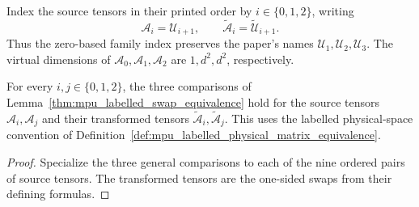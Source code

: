 \begin{definition}
    \label{def:mpu_three_labelled_source_families}
    \leanok
    Index the source tensors in their printed order by
    $i\in\{0,1,2\}$, writing
    \[
        \mathcal A_i=\mathcal U_{i+1},\qquad
        \widetilde{\mathcal A}_i=\widetilde{\mathcal U}_{i+1}.
    \]
    Thus the zero-based family index preserves the paper's names
    $\mathcal U_1,\mathcal U_2,\mathcal U_3$. The virtual dimensions of
    $\mathcal A_0,\mathcal A_1,\mathcal A_2$ are $1,d^2,d^2$, respectively.
\end{definition}

\begin{lemma}
    \label{thm:mpu_three_labelled_source_swap_comparison}
    \leanok
    For every $i,j\in\{0,1,2\}$, the three comparisons of
    Lemma~\ref{thm:mpu_labelled_swap_equivalence} hold for the source
    tensors $\mathcal A_i,\mathcal A_j$ and their transformed tensors
    $\widetilde{\mathcal A}_i,\widetilde{\mathcal A}_j$.
    This uses the labelled physical-space convention of
    Definition~\ref{def:mpu_labelled_physical_matrix_equivalence}.
\end{lemma}

\begin{proof}\leanok
    Specialize the three general comparisons to each of the nine ordered
    pairs of source tensors. The transformed tensors are the one-sided
    swaps from their defining formulas.
\end{proof}
